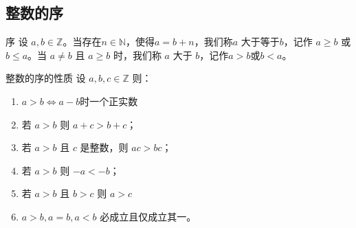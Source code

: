 \subsection{整数的序}

\begin{definition}{序}{}
	设 $a,b\in \mathbb Z$。当存在$n\in \mathbb N$，使得$a=b+n$，我们称$a$ 大于等于$b$，记作 $a \ge b$ 或 $b \le a$。当 $a \ne b$ 且 $a\ge b$ 时，我们称 $a$ 大于 $b$，记作$a>b$或$b<a$。
\end{definition}

\begin{theorem}{整数的序的性质}{}
	设 $a,b,c\in \mathbb Z$ 则：
	\begin{enumerate}
		\item $a> b\iff a-b$时一个正实数
		\item 若 $a>b$ 则 $a+c>b+c$；
		\item 若 $a>b$ 且 $c$ 是整数，则 $ac>bc$；
		\item 若 $a>b$ 则 $-a<-b$；
		\item 若 $a>b$ 且 $b>c$ 则 $a>c$
		\item $a>b,a=b,a<b$ 必成立且仅成立其一。
	\end{enumerate}
\end{theorem}











